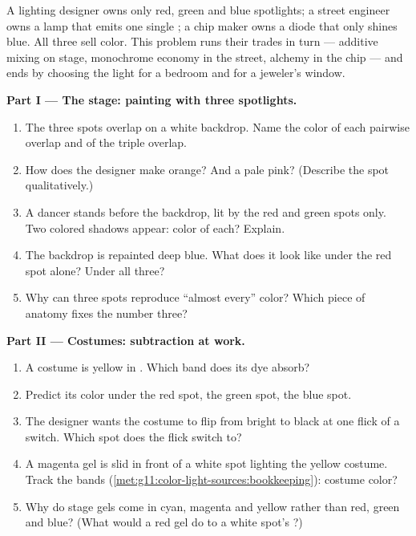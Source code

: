 \begin{problem}
\label{pb:g11:color-light-sources:1}
A lighting designer owns only red, green and blue spotlights; a street
engineer owns a lamp that emits one single ; a chip maker owns
a diode that only shines blue. All three sell color. This problem runs
their trades in turn --- additive mixing on stage, monochrome economy in
the street,  alchemy in the chip --- and ends by choosing the
light for a bedroom and for a jeweler's window.

\medskip
\noindent\textbf{Part I --- The stage: painting with three spotlights.}
\begin{enumerate}
  \item The three spots overlap on a white backdrop. Name the color of
        each pairwise overlap and of the triple overlap.
  \item How does the designer make orange? And a pale pink? (Describe
        the spot  qualitatively.)
  \item A dancer stands before the backdrop, lit by the red and green
        spots only. Two colored shadows appear: color of each? Explain.
  \item The backdrop is repainted deep blue. What does it look like
        under the red spot alone? Under all three?
  \item Why can three spots reproduce ``almost every'' color? Which
        piece of anatomy fixes the number three?
\end{enumerate}

\medskip
\noindent\textbf{Part II --- Costumes: subtraction at work.}
\begin{enumerate}[resume]
  \item A costume is yellow in . Which band does its dye
        absorb?
  \item Predict its color under the red spot, the green spot, the blue
        spot.
  \item The designer wants the costume to flip from bright to black at
        one flick of a switch. Which spot does the flick switch to?
  \item A magenta gel is slid in front of a white spot lighting the
        yellow costume. Track the bands
        (\cref{met:g11:color-light-sources:bookkeeping}): costume color?
  \item Why do stage gels come in cyan, magenta and yellow rather than
        red, green and blue? (What would a red gel do to a white spot's
        ?)
\end{enumerate}


\end{problem}
